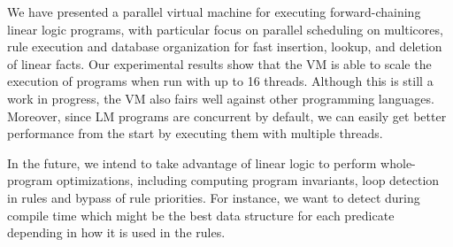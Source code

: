 We have presented a parallel virtual machine for executing forward-chaining linear logic programs, with particular focus
on parallel scheduling on multicores, rule execution and database organization for fast insertion,
lookup, and deletion of linear facts.
Our experimental results show that the VM is able to scale the execution of programs when run with up to 16 threads.
Although this is still a work in progress, the VM also fairs well against other programming languages.
Moreover, since LM programs are concurrent by default, we can easily get better performance from the start by executing
them with multiple threads.

In the future, we intend to take advantage of linear logic to perform whole-program optimizations,
including computing program invariants, loop detection in rules and bypass of rule priorities. For instance,
we want to detect during compile time which might be the best data structure for each predicate depending in how it
is used in the rules.
